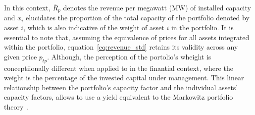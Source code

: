     In this context, $\overline{R}_{p}$ denotes the revenue per megawatt (MW) of installed capacity and $x_{i}$
    elucidates the proportion of the total capacity of the portfolio denoted by asset $i$,
    which is also indicative of the weight of asset $i$ in the portfolio.
    It is essential to note that, assuming the equivalence of prices for all assets integrated within the portfolio,
    equation~\ref{eq:revenue_std} retains its validity across any given price $p_{tp}$.
    Although, the perception of the portolio's wheight is conceptiionally different when applied to in the finantial context,
    where the weight is the percentage of the invested capital under management.
    This linear relationship between the portfolio's capacity factor and the individual assets' capacity factors,
    allows to use a yield equivalent to the Markowitz portfolio theory~\cite{thomaidis_handling_2023}.







